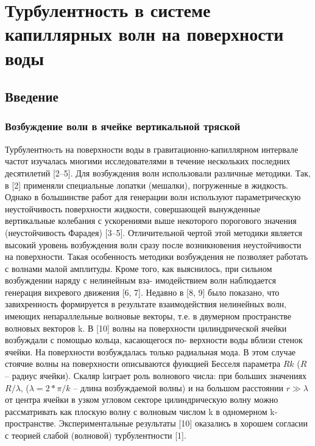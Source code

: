 \chapter{Турбулентность в системе капиллярных волн на поверхности воды}
\section{Введение}
\subsection{Возбуждение волн в ячейке вертикальной тряской} \label{subsect_boundary}

Турбулентноcть на поверхности воды в гравитационно-капиллярном интервале частот изучалась многими исследователями в течение нескольких последних десятилетий [2–5]. Для возбуждения волн использовали различные методики. Так, в [2] применяли специальные лопатки (мешалки), погруженные в жидкость. Однако в большинстве работ для генерации волн используют параметрическую неустойчивость поверхности жидкости, совершающей вынужденные вертикальные колебания с ускорениями выше некоторого порогового значения (неустойчивость Фарадея) [3–5]. Отличительной чертой этой методики является высокий уровень возбуждения волн сразу после возникновения неустойчивости на поверхности. Такая особенность методики возбуждения не позволяет работать с волнами малой амплитуды. Кроме того, как выяснилось, при сильном возбуждении наряду с нелинейным вза- имодействием волн наблюдается генерация вихревого движения [6, 7]. Недавно в [8, 9] было показано, что завихренность формируется в результате взаимодействия нелинейных волн, имеющих непараллельные волновые векторы, т.е. в двумерном пространстве волновых векторов k. В [10] волны на поверхности цилиндрической ячейки возбуждали с помощью кольца, касающегося по- верхности воды вблизи стенок ячейки. На поверхности возбуждалась только радиальная мода. В этом случае стоячие волны на поверхности описываются функцией Бесселя параметра $Rk$ ($R$ – радиус ячейки). Скаляр k$ $играет роль волнового числа: при больших значениях $R/\lambda$, ($\lambda = 2*\pi/k$ – длина возбуждаемой волны) и на большом расстоянии $r \gg \lambda$ от центра ячейки в узком угловом секторе цилиндрическую волну можно рассматривать как плоскую волну с волновым числом k в одномерном k-пространстве. Экспериментальные результаты [10] оказались в хорошем согласии с теорией слабой (волновой) турбулентности [1].

